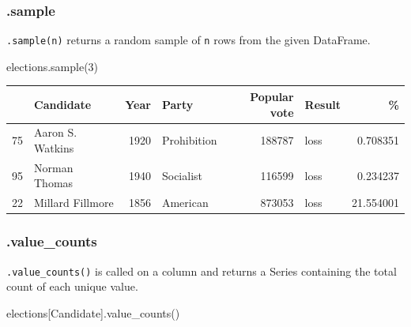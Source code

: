 \documentclass[
  letterpaper,
  DIV=11,
  numbers=noendperiod]{scrreprt}
\newenvironment{Shaded}{\begin{snugshade}}{\end{snugshade}}
\newcommand{\DecValTok}[1]{\textcolor[rgb]{0.68,0.00,0.00}{#1}}
\newcommand{\NormalTok}[1]{\textcolor[rgb]{0.00,0.23,0.31}{#1}}
\newcommand{\StringTok}[1]{\textcolor[rgb]{0.13,0.47,0.30}{#1}}
\begin{document}
\hypertarget{sample}{%
\subsubsection{.sample}\label{sample}}

\texttt{.sample(n)} returns a random sample of \texttt{n} rows from the
given DataFrame.

\begin{Shaded}
\begin{Highlighting}[]
\NormalTok{elections.sample(}\DecValTok{3}\NormalTok{)}
\end{Highlighting}
\end{Shaded}

\begin{tabular}{llrlrlr}
\toprule
{} &         Candidate &  Year &        Party &  Popular vote & Result &          \% \\
\midrule
75 &  Aaron S. Watkins &  1920 &  Prohibition &        188787 &   loss &   0.708351 \\
95 &     Norman Thomas &  1940 &    Socialist &        116599 &   loss &   0.234237 \\
22 &  Millard Fillmore &  1856 &     American &        873053 &   loss &  21.554001 \\
\bottomrule
\end{tabular}

\hypertarget{value_counts}{%
\subsubsection{.value\_counts}\label{value_counts}}

\texttt{.value\_counts()} is called on a column and returns a Series
containing the total count of each unique value.

\begin{Shaded}
\begin{Highlighting}[]
\NormalTok{elections[}\StringTok{\textquotesingle{}Candidate\textquotesingle{}}\NormalTok{].value\_counts()}
\end{Highlighting}
\end{Shaded}
\end{document}
